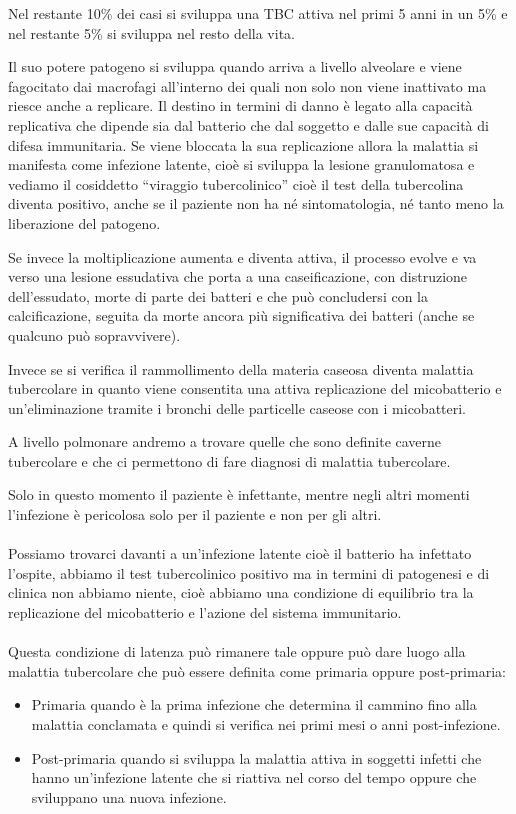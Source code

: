 Nel restante 10\% dei casi si sviluppa una TBC attiva nel primi 5 anni
in un 5\% e nel restante 5\% si sviluppa nel resto della vita.

Il suo potere patogeno si sviluppa quando arriva a livello alveolare e
viene fagocitato dai macrofagi all'interno dei quali non solo non viene
inattivato ma riesce anche a replicare. Il destino in termini di danno è
legato alla capacità replicativa che dipende sia dal batterio che dal
soggetto e dalle sue capacità di difesa immunitaria. Se viene bloccata
la sua replicazione allora la malattia si manifesta come infezione
latente, cioè si sviluppa la lesione granulomatosa e vediamo il
cosiddetto ``viraggio tubercolinico'' cioè il test della tubercolina
diventa positivo, anche se il paziente non ha né sintomatologia, né
tanto meno la liberazione del patogeno.

Se invece la moltiplicazione aumenta e diventa attiva, il processo
evolve e va verso una lesione essudativa che porta a una caseificazione,
con distruzione dell'essudato, morte di parte dei batteri e che può
concludersi con la calcificazione, seguita da morte ancora più
significativa dei batteri (anche se qualcuno può sopravvivere).

Invece se si verifica il rammollimento della materia caseosa diventa
malattia tubercolare in quanto viene consentita una attiva replicazione
del micobatterio e un'eliminazione tramite i bronchi delle particelle
caseose con i micobatteri.

A livello polmonare andremo a trovare quelle che sono definite caverne
tubercolare e che ci permettono di fare diagnosi di malattia
tubercolare.

Solo in questo momento il paziente è infettante, mentre negli altri
momenti l'infezione è pericolosa solo per il paziente e non per gli
altri.
\\\\
Possiamo trovarci davanti a un'infezione latente cioè il batterio ha
infettato l'ospite, abbiamo il test tubercolinico positivo ma in termini
di patogenesi e di clinica non abbiamo niente, cioè abbiamo una
condizione di equilibrio tra la replicazione del micobatterio e l'azione
del sistema immunitario.
\\\\
Questa condizione di latenza può rimanere tale oppure può dare luogo
alla malattia tubercolare che può essere definita come primaria oppure
post-primaria:
\begin{itemize}
\item 
  Primaria quando è la prima infezione che determina il cammino fino
alla malattia conclamata e quindi si verifica nei primi mesi o anni
post-infezione.
\item 
  Post-primaria quando si sviluppa la malattia attiva in soggetti
infetti che hanno un'infezione latente che si riattiva nel corso del
tempo oppure che sviluppano una nuova infezione.
\end{itemize}
